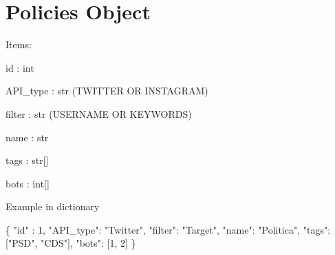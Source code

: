 \section*{Policies Object}


\begin{DoxyItemize}
\item Items\+:
\begin{DoxyItemize}
\item id \+: int
\item A\+P\+I\+\_\+type \+: str (T\+W\+I\+T\+T\+ER OR I\+N\+S\+T\+A\+G\+R\+AM)
\item filter \+: str (U\+S\+E\+R\+N\+A\+ME OR K\+E\+Y\+W\+O\+R\+DS)
\item name \+: str
\item tags \+: str\mbox{[}\mbox{]}
\item bots \+: int\mbox{[}\mbox{]}
\end{DoxyItemize}
\item Example in dictionary 
\begin{DoxyCode}
\{ "id" : 1, "API\_type": "Twitter", "filter": "Target", "name": "Politica", "tags": ["PSD", "CDS"], "bots":
       [1, 2] \}
\end{DoxyCode}
 
\end{DoxyItemize}